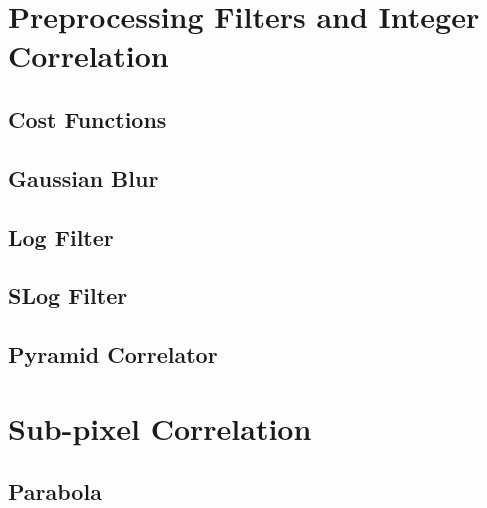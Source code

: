 \section{Preprocessing Filters and Integer Correlation}

\subsection{Cost Functions}

\subsection{Gaussian Blur}

\subsection{Log Filter}

\subsection{SLog Filter}

\subsection{Pyramid Correlator}

\section{Sub-pixel Correlation}

\subsection{Parabola}

